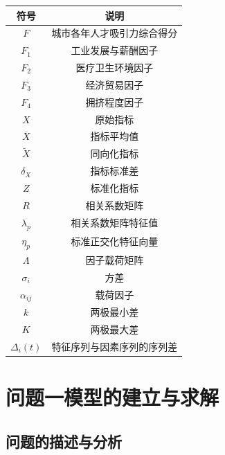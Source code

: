 \documentclass{whutmod}
\begin{document}
	\begin{table}[H]
	\label{biao} \centering
		\begin{tabular}{cc}
			\toprule[1.5pt]
			\multicolumn{1}{m{5cm}}{\centering 符号} & \multicolumn{1}{m{5cm}}{\centering 说明} \\
			\midrule[1pt]
			$F$	 &  城市各年人才吸引力综合得分  \\ 
			$F_{1}$ &  工业发展与薪酬因子 \\ 
			$F_{2}$	 &  医疗卫生环境因子 \\ 
			$F_{3}$  &  经济贸易因子 \\ 
			$F_{4}$  &  拥挤程度因子 \\ 
			$X$  &  原始指标 \\ 
			$\overline{X}$  &  指标平均值 \\ 
			$\widetilde{X}$  &  同向化指标 \\ 
	     	$\delta_{X}$  &  指标标准差 \\ 
	     	$Z$  & 标准化指标 \\ 
	     	$R$  & 相关系数矩阵 \\ 
	     	$\lambda_{p}$  & 相关系数矩阵特征值 \\ 
	     	$\eta _ {p}$  & 标准正交化特征向量 \\ 
	     	$\Lambda$ & 因子载荷矩阵 \\ 
	     	$\sigma_{i}$ & 方差 \\
	     	$\alpha_{i j}$ & 载荷因子 \\
	     	$k$ & 两极最小差 \\
	     	$K$ & 两极最大差 \\
	     	$\Delta _{i}(t)$ & 特征序列与因素序列的序列差 \\
			\bottomrule[1.5pt]
		\end{tabular}
	\end{table}

	\section{问题一模型的建立与求解}
	\subsection{问题的描述与分析}
\end{document}
